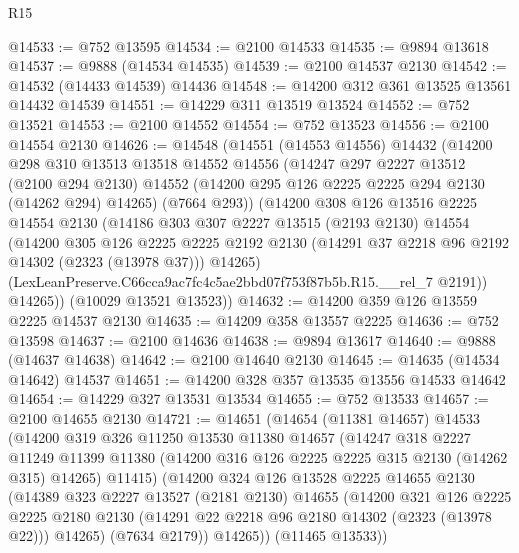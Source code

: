 \begin{lexlean}{R15}
\begin{coremodule}
@14533 := @752 @13595
@14534 := @2100 @14533
@14535 := @9894 @13618
@14537 := @9888 (@14534 @14535)
@14539 := @2100 @14537 @2130
@14542 := @14532 (@14433 @14539) @14436
@14548 := @14200 @312 @361 @13525 @13561 @14432 @14539
@14551 := @14229 @311 @13519 @13524
@14552 := @752 @13521
@14553 := @2100 @14552
@14554 := @752 @13523
@14556 := @2100 @14554 @2130
@14626 := @14548
    (@14551
      (@14553 @14556)
      @14432
      (@14200
        @298
        @310
        @13513
        @13518
        @14552
        @14556
        (@14247
          @297
          @2227
          @13512
          (@2100 @294 @2130)
          @14552
          (@14200 @295 @126 @2225 @2225 @294 @2130 (@14262 @294) @14265)
          (@7664 @293))
        (@14200
          @308
          @126
          @13516
          @2225
          @14554
          @2130
          (@14186
            @303
            @307
            @2227
            @13515
            (@2193 @2130)
            @14554
            (@14200
              @305
              @126
              @2225
              @2225
              @2192
              @2130
              (@14291 @37 @2218 @96 @2192 @14302 (@2323 (@13978 @37)))
              @14265)
            (LexLeanPreserve.C66cca9ac7fc4c5ae2bbd07f753f87b5b.R15.__rel_7 @2191))
          @14265))
      (@10029 @13521 @13523))
@14632 := @14200 @359 @126 @13559 @2225 @14537 @2130
@14635 := @14209 @358 @13557 @2225
@14636 := @752 @13598
@14637 := @2100 @14636
@14638 := @9894 @13617
@14640 := @9888 (@14637 @14638)
@14642 := @2100 @14640 @2130
@14645 := @14635 (@14534 @14642) @14537
@14651 := @14200 @328 @357 @13535 @13556 @14533 @14642
@14654 := @14229 @327 @13531 @13534
@14655 := @752 @13533
@14657 := @2100 @14655 @2130
@14721 := @14651
    (@14654
      (@11381 @14657)
      @14533
      (@14200
        @319
        @326
        @11250
        @13530
        @11380
        @14657
        (@14247
          @318
          @2227
          @11249
          @11399
          @11380
          (@14200 @316 @126 @2225 @2225 @315 @2130 (@14262 @315) @14265)
          @11415)
        (@14200
          @324
          @126
          @13528
          @2225
          @14655
          @2130
          (@14389
            @323
            @2227
            @13527
            (@2181 @2130)
            @14655
            (@14200
              @321
              @126
              @2225
              @2225
              @2180
              @2130
              (@14291 @22 @2218 @96 @2180 @14302 (@2323 (@13978 @22)))
              @14265)
            (@7634 @2179))
          @14265))
      (@11465 @13533))

\end{coremodule}
\end{lexlean}
